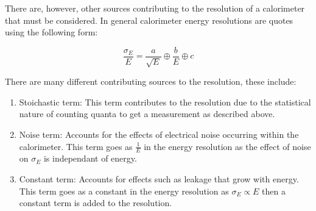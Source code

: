 There are, however, other sources contributing to the resolution of a calorimeter that must be considered.  In general calorimeter energy resolutions are quotes using the following form:

\begin{equation}
\frac{\sigma_{E}}{E} = \frac{a}{\sqrt{E}} \oplus \frac{b}{E} \oplus c
\end{equation}

There are many different contributing sources to the resolution, these include:
\begin{enumerate}
\item Stoichastic term:  This term contributes to the resolution due to the statistical nature of counting quanta to get a measurement as described above.
\item Noise term:  Accounts for the effects of electrical noise occurring within the calorimeter.  This term goes as $\frac{1}{E}$ in the energy resolution as the effect of noise on $\sigma_{E}$ is independant of energy.
\item Constant term:  Accounts for effects such as leakage that grow with energy.  This term goes as a constant in the energy resolution as $\sigma_{E} \propto E$ then a constant term is added to the resolution.
\end{enumerate}

